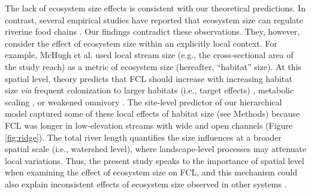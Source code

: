 \documentclass[11pt, class=article, crop=false]{standalone}
\begin{document}
The lack of ecosystem size effects is consistent with our theoretical predictions.
In contrast, several empirical studies have reported that ecosystem size can regulate riverine food chains \citep{mchugh_dual_2010, mcintosh_capacity_2018}.
Our findings contradict these observations.
They, however, consider the effect of ecosystem size within an explicitly local context.
For example, McHugh et al. \citep{mchugh_dual_2010} used local stream size (e.g., the cross-sectional area of the study reach) as a metric of ecosystem size (hereafter, ``habitat'' size).
At this spatial level, theory predicts that FCL should increase with increasing habitat size \textit{via} frequent colonization to larger habitats (i.e., target effects) \citep{shibasaki_food_2024}, metabolic scaling \citep{mcintosh_capacity_2018}, or weakened omnivory \citep{ward_mechanistic_2017}.
The site-level predictor of our hierarchical model captured some of these local effects of habitat size (see Methods) because FCL was longer in low-elevation streams with wide and open channels (Figure \ref{fig:ridge}).
The total river length quantifies the size influences at a broader spatial scale (i.e., watershed level), where landscape-level processes may attenuate local variations. 
Thus, the present study speaks to the importance of spatial level when examining the effect of ecosystem size on FCL, and this mechanism could also explain inconsistent effects of ecosystem size observed in other systems \citep{takimoto_environmental_2013}.
\end{document}
